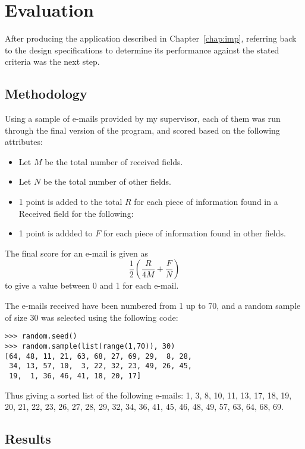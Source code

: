 \chapter{Evaluation}\label{chap:test}
After producing the application described in Chapter~\ref{chap:imp}, referring
back to the design specifications to determine its performance against the
stated criteria was the next step.  

\section{Methodology}
Using a sample of e-mails provided by my supervisor, each of them was run
through the final version of the program, and scored based on the following
attributes:

\begin{itemize}
\item Let $M$ be the total number of received fields.
\item Let $N$ be the total number of other fields.
\item 1 point is added to the total $R$ for each piece of information found in a Received field for the following:
\item 1 point is addded to $F$ for each piece of information found in other fields.
\end{itemize}

The final score for an e-mail is given as \[\frac12\left(\frac R{4M}+\frac
FN\right)\]to give a value between 0 and 1 for each e-mail.

The e-mails received have been numbered from 1 up to 70, and a random sample of
size 30 was selected using the following code:

\begin{verbatim}
>>> random.seed()
>>> random.sample(list(range(1,70)), 30)
[64, 48, 11, 21, 63, 68, 27, 69, 29,  8, 28,
 34, 13, 57, 10,  3, 22, 32, 23, 49, 26, 45,
 19,  1, 36, 46, 41, 18, 20, 17]
\end{verbatim}

Thus giving a sorted list of the following e-mails: 1, 3, 8, 10, 11, 13, 17,
18, 19, 20, 21, 22, 23, 26, 27, 28, 29, 32, 34, 36, 41, 45, 46, 48, 49, 57, 63,
64, 68, 69.

\section{Results}


